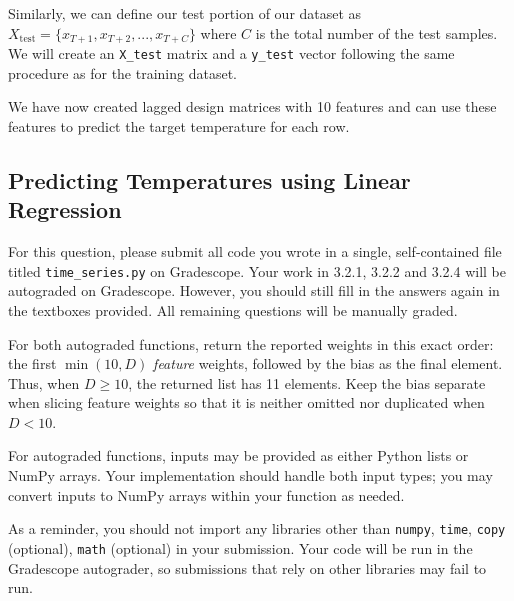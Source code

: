 Similarly, we can define our test portion of our dataset as $X_{\mathrm{test}} = \{x_{T+1}, x_{T+2}, ... ,x_{T+C} \}$ where $C$ is the total number of the test samples. We will create an \texttt{X\_test} matrix and a \texttt{y\_test} vector following the same procedure as for the training dataset. 

We have now created lagged design matrices with 10 features and can use these features to predict the target temperature for each row. 

\clearpage

\subsection{Predicting Temperatures using Linear Regression}

For this question, please submit all code you wrote in a single, self-contained file titled \texttt{time\_series.py} on Gradescope. Your work in 3.2.1, 3.2.2 and 3.2.4 will be autograded on Gradescope. However, you should still fill in the answers again in the textboxes provided. All remaining questions will be manually graded.

For both autograded functions, return the reported weights in this exact order:
the first $\min(10,D)$ \emph{feature} weights, followed by the bias as the final
element. Thus, when $D\geq 10$, the returned list has 11 elements. Keep the bias
separate when slicing feature weights so that it is neither omitted nor duplicated
when $D<10$.

For autograded functions, inputs may be provided as either Python lists or
NumPy arrays. Your implementation should handle both input types; you may
convert inputs to NumPy arrays within your function as needed.

As a reminder, you should not import any libraries other than \texttt{numpy}, \texttt{time}, \texttt{copy} (optional), \texttt{math} (optional) in your submission. Your code will be run in the Gradescope autograder, so submissions that rely on other libraries may fail to run. 

